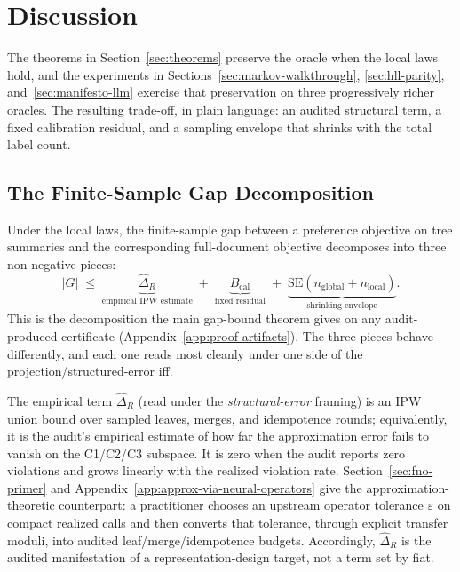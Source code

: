 \section{Discussion}\label{sec:discussion}

The theorems in Section~\ref{sec:theorems} preserve the oracle when the local laws hold, and the experiments in Sections~\ref{sec:markov-walkthrough}, \ref{sec:hll-parity}, and~\ref{sec:manifesto-llm} exercise that preservation on three progressively richer oracles. The resulting trade-off, in plain language: an audited structural term, a fixed calibration residual, and a sampling envelope that shrinks with the total label count.

\subsection{The Finite-Sample Gap Decomposition}\label{sec:discussion-tradeoff}

Under the local laws, the finite-sample gap between a preference
objective on tree summaries and the corresponding full-document
objective decomposes into three non-negative pieces:
\begin{equation}\label{eq:discussion-bound}
|G|
\;\le\;
\underbrace{\hat{\Delta}_R}_{\text{empirical IPW estimate}}
\;+\;
\underbrace{B_{\mathrm{cal}}}_{\text{fixed residual}}
\;+\;
\underbrace{\text{SE}(n_{\mathrm{global}} + n_{\mathrm{local}})}_{\text{shrinking envelope}}.
\end{equation}
This is the decomposition the main gap-bound theorem gives on any audit-produced certificate (Appendix~\ref{app:proof-artifacts}). The three pieces behave differently, and each one reads most cleanly under one side of the projection/structured-error iff.

The empirical term $\hat{\Delta}_R$ (read under the \emph{structural-error} framing) is an IPW union bound over sampled leaves, merges, and idempotence rounds; equivalently, it is the audit's empirical estimate of how far the approximation error fails to vanish on the C1/C2/C3 subspace. It is zero when the audit reports zero violations and grows linearly with the realized violation rate. Section~\ref{sec:fno-primer} and Appendix~\ref{app:approx-via-neural-operators} give the approximation-theoretic counterpart: a practitioner chooses an upstream operator tolerance $\varepsilon$ on compact realized calls and then converts that tolerance, through explicit transfer moduli, into audited leaf/merge/idempotence budgets. Accordingly, $\hat{\Delta}_R$ is the audited manifestation of a representation-design target, not a term set by fiat.

